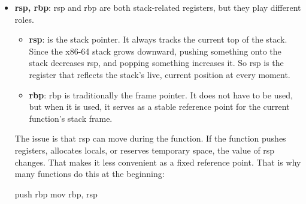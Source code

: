 \documentclass{report}
\begin{document}
\begin{itemize}
\begin{enumerate}
                    \item $B$ runs, possibly building its own stack frame.
                    \item $B$ returns with ret, which pops the return address and jumps back to $A$.
                \end{enumerate}
                So the stack frame of $B$ begins only after control has entered $B$.
                \bigbreak \noindent 
                A stack frame is the region of the stack belonging to one function call. That region may contain:
                \begin{itemize}
                    \item the return address
                    \item the saved old frame pointer
                    \item local variables
                    \item spilled registers
                    \item saved callee-saved registers
                    \item temporary storage
                \end{itemize}
            \item \textbf{rsp, rbp}: rsp and rbp are both stack-related registers, but they play different roles.
                \bigbreak \noindent 
                \begin{itemize}
                    \item \textbf{rsp}: is the stack pointer. It always tracks the current top of the stack. Since the x86-64 stack grows downward, pushing something onto the stack decreases rsp, and popping something increases it. So rsp is the register that reflects the stack’s live, current position at every moment.
                    \item \textbf{rbp}: rbp is traditionally the frame pointer. It does not have to be used, but when it is used, it serves as a stable reference point for the current function’s stack frame. 
                \end{itemize}
                The issue is that rsp can move during the function. If the function pushes registers, allocates locals, or reserves temporary space, the value of rsp changes. That makes it less convenient as a fixed reference point. That is why many functions do this at the beginning:
                \bigbreak \noindent 
                \begin{cppcode}
                push rbp
                mov rbp, rsp

\end{cppcode}
\end{itemize}
\end{document}

